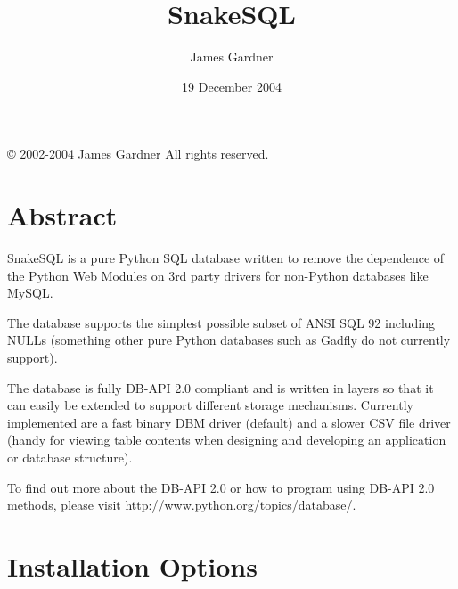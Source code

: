 \documentclass{howto}
\title{SnakeSQL}
\author{James Gardner}
\date{19 December 2004}
\begin{document}
\maketitle
\begin{center}
\copyright{} 2002-2004 James Gardner All rights reserved.
\end{center}



\tableofcontents

\section{Abstract}


SnakeSQL is a pure Python SQL database written to remove the dependence of the Python Web Modules on 3rd party drivers for non-Python databases like MySQL.

The database supports the simplest possible subset of ANSI SQL 92 including NULLs (something other pure Python databases such as Gadfly do not currently support). 

The database is fully DB-API 2.0 compliant and is written in layers so that it can easily be extended to support different storage mechanisms. Currently implemented are a fast binary DBM driver (default) and a slower CSV file driver (handy for viewing table contents when designing and developing an application or database structure).

\begin{seealso}
    {To find out more about the DB-API 2.0 or how to program using DB-API 2.0 methods, please visit \url{http://www.python.org/topics/database/}.}
\end{seealso}



\section{Installation Options}
\end{document}

